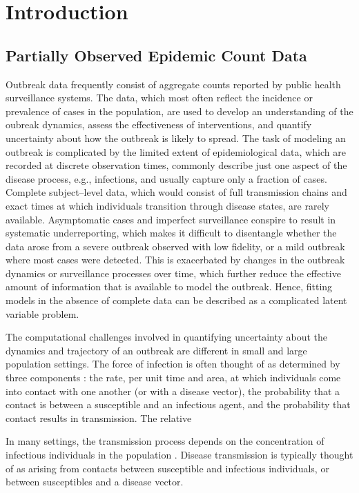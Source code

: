 \chapter{Introduction}
\label{chap:introduction}

\section{Partially Observed Epidemic Count Data}
\label{sec:data_background}

Outbreak data frequently consist of aggregate counts reported by public health surveillance systems. The data, which most often reflect the incidence or prevalence of cases in the population, are used to develop an understanding of the oubreak dynamics, assess the effectiveness of interventions, and quantify uncertainty about how the outbreak is likely to spread. The task of modeling an outbreak is complicated by the limited extent of epidemiological data, which are recorded at discrete observation times, commonly describe just one aspect of the disease process, e.g., infections, and usually capture only a fraction of cases. Complete subject--level data, which would consist of full transmission chains and exact times at which individuals transition through disease states, are rarely available. Asymptomatic cases and imperfect surveillance conspire to result in systematic underreporting, which makes it difficult to disentangle whether the data arose from a severe outbreak observed with low fidelity, or a mild outbreak where most cases were detected. This is exacerbated by changes in the outbreak dynamics or surveillance processes over time, which further reduce the effective amount of information that is available to model the outbreak. Hence, fitting models in the absence of complete data can be described as a complicated latent variable problem. 

The computational challenges involved in quantifying uncertainty about the dynamics and trajectory of an outbreak are different in small and large population settings. The force of infection is often thought of as determined by three components \cite{dejong1995does,mccallum2001should}: the rate, per unit time and area, at which individuals come into contact with one another (or with a disease vector), the probability that a contact is between a susceptible and an infectious agent, and the probability that contact results in transmission. The relative 

In many settings, the transmission process depends on the concentration of infectious individuals in the population  \cite{dejong1995does,hu2013scaling,mccallum2001should}. Disease transmission is typically thought of as arising from contacts between  susceptible and infectious individuals, or between susceptibles and a disease vector. 

